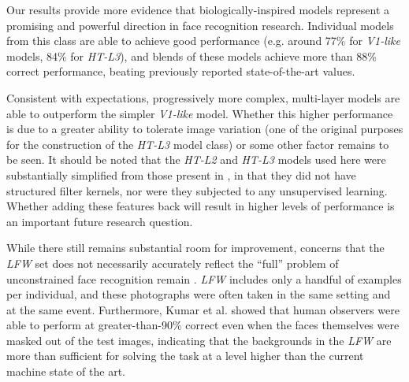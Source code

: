 
Our results provide more evidence that biologically-inspired models represent a promising
and powerful direction in face recognition research. Individual models from this
class are able to achieve good performance (e.g. around 77\% for \emph{V1-like} models,
84\% for \emph{HT-L3}), and blends of these models achieve more than 88\%
correct performance, beating previously reported state-of-the-art values.

Consistent with expectations, progressively more complex, multi-layer models are
able to outperform the simpler \emph{V1-like} model. Whether this higher
performance is due to a greater ability to tolerate image variation (one of the
original purposes for the construction of the \emph{HT-L3} model
class\cite{pinto:plos09}) or some other factor remains to be seen. It should be
noted that the \emph{HT-L2} and \emph{HT-L3} models used here were substantially
simplified from those present in \cite{pinto:plos09}, in that they did not have
structured filter kernels, nor were they subjected to any unsupervised learning.
Whether adding these features back will result in higher levels of performance
is an important future research question.

While there still remains substantial room for improvement, concerns that
the \emph{LFW} set does not necessarily accurately reflect the ``full'' problem
of unconstrained face recognition
remain \cite{pinto:eccv08,pinto:cvpr09,kumar:iccv09}.  \emph{LFW} includes only
a handful of examples per individual, and these photographs were often taken in
the same setting and at the same event.  Furthermore, Kumar et
al. \cite{kumar:iccv09} showed that human observers were able to perform at
greater-than-90\% correct even when the faces themselves were masked out of the
test images, indicating that the backgrounds in the \emph{LFW} are more than
sufficient for solving the task at a level higher than the current machine state
of the art.

